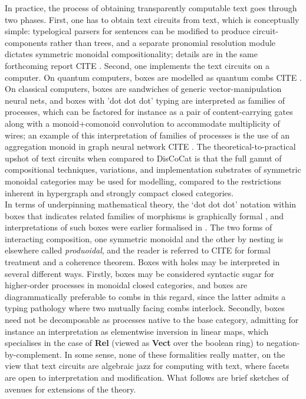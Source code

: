 In practice, the process of obtaining transparently computable text goes through two phases. First, one has to obtain text circuits from text, which is conceptually simple: typelogical parsers for sentences can be modified to produce circuit-components rather than trees, and a separate pronomial resolution module dictates symmetric monoidal compositionality; details are in the same forthcoming report \bR CITE \e. Second, one implements the text circuits on a computer. On quantum computers, boxes are modelled as quantum combs \bR CITE \e. On classical computers, boxes are sandwiches of generic vector-manipulation neural nets, and boxes with 'dot dot dot' typing are interpreted as families of processes, which can be factored for instance as a pair of content-carrying gates along with a monoid+comonoid convolution to accommodate multiplicity of wires; an example of this interpretation of families of processes is the use of an aggregation monoid in graph neural network \bR CITE \e. The theoretical-to-practical upshot of text circuits when compared to DisCoCat is that the full gamut of compositional techniques, variations, and implementation substrates of symmetric monoidal categories may be used for modelling, compared to the restrictions inherent in hypergraph and strongly compact closed categories.\\

In terms of underpinning mathematical theory, the `dot dot dot' notation within boxes that indicates related families of morphisms is graphically formal \citep{wilson_string_2022}, and interpretations of such boxes were earlier formalised in \citep{merry_reasoning_2014,quick_-logic_2015,zamdzhiev_rewriting_2017}. The two forms of interacting composition, one symmetric monoidal and the other by nesting is elsewhere called \emph{produoidal}, and the reader is referred to \bR CITE \e for formal treatment and a coherence theorem. Boxes with holes may be interpreted in several different ways. Firstly, boxes may be considered syntactic sugar for higher-order processes in monoidal closed categories, and boxes are diagrammatically preferable to combs in this regard, since the latter admits a typing pathology where two mutually facing combs interlock. Secondly, boxes need not be decomposable as processes native to the base category, admitting for instance an interpretation as elementwise inversion in linear maps, which specialises in the case of \textbf{Rel} (viewed as \textbf{Vect} over the boolean ring) to negation-by-complement. In some sense, none of these formalities really matter, on the view that text circuits are algebraic jazz for computing with text, where facets are open to interpretation and modification. What follows are brief sketches of avenues for extensions of the theory.


